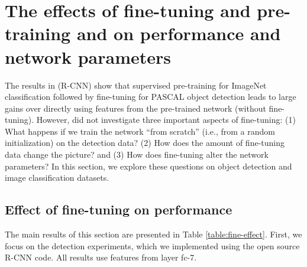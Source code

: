 \section{The effects of fine-tuning and pre-training and on performance and network parameters}
\label{sec:fine}
The results in \cite{Rcnn} (R-CNN) show that supervised pre-training for ImageNet classification followed by fine-tuning for PASCAL object detection leads to large gains over directly using features from the pre-trained network (without fine-tuning).
However, \cite{Rcnn} did not investigate three important aspects of fine-tuning: (1) What happens if we train the network ``from scratch'' (i.e., from a random initialization) on the detection data? (2) How does the amount of fine-tuning data change the picture? and (3) How does fine-tuning alter the network parameters?
In this section, we explore these questions on object detection and image classification datasets.

\subsection{Effect of fine-tuning on performance}
\label{sub:fine-performance}
\setlength{\tabcolsep}{2pt}
\begin{table}[t!]
\begin{center}
\caption{Comparing the performance of CNNs trained from scratch, pre-trained on ImageNet, and fine-tuned. PASCAL-DET+DATA includes additional data from VOC 2012 trainval.}
\vspace{0.3em}
\label{table:fine-effect}
\end{center}
\end{table}
\setlength{\tabcolsep}{1.4pt}
The main results of this section are presented in Table \ref{table:fine-effect}.
First, we focus on the detection experiments, which we implemented using the open source R-CNN code.
All results use features from layer fc-7.

